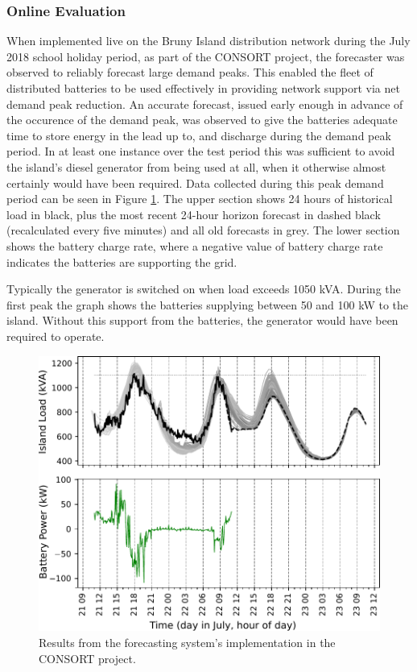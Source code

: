 \subsubsection{Online Evaluation}
When implemented live on the Bruny Island distribution network during the July 2018 school holiday period, as part of the CONSORT project, the forecaster was observed to reliably forecast large demand peaks.
This enabled the fleet of distributed batteries to be used effectively in providing network support via net demand peak reduction. An accurate forecast, issued early enough in advance of the occurence of the demand peak, was observed to give the batteries adequate time to store energy in the lead up to, and discharge during the demand peak period. In at least one instance over the test period this was sufficient to avoid the island's diesel generator from being used at all, when it otherwise almost certainly would have been required.
Data collected during this peak demand period can be seen in Figure \ref{fig:bruny_nac}.
The upper section shows 24 hours of historical load in black, plus the most recent 24-hour horizon forecast in dashed black (recalculated every five minutes) and all old forecasts in grey.
The lower section shows the battery charge rate, where a negative value of battery charge rate indicates the batteries are supporting the grid.

Typically the generator is switched on when load exceeds 1050 kVA.
During the first peak the graph shows the batteries supplying between 50 and 100 kW to the island.
Without this support from the batteries, the generator would have been required to operate.

\begin{figure}[htbp]
	\centerline{\includegraphics[width=.65\textwidth]{images/bruny_nac.pdf}}
	\caption{Results from the forecasting system's implementation in the CONSORT project.}
	\label{fig:bruny_nac}
\end{figure}




